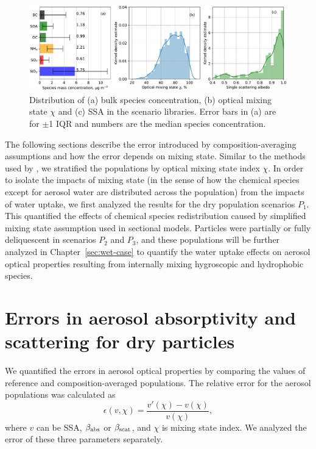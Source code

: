 \documentclass[edeposit,fullpage]{uiucthesis2009}
\begin{document}
\begin{figure}
	\centering
	\includegraphics[scale=0.5]{chap4_figs/fig3.pdf}
	\caption{Distribution of (a) bulk species concentration, (b)
          optical mixing state $\chi$ and (c) SSA in the scenario
          libraries. Error bars in (a) are for $\pm$1 IQR and numbers
          are the median species concentration.}
	\label{fig2:sce_overview}
\end{figure}

The following sections describe the error introduced by
composition-averaging assumptions and how the error depends on mixing
state. Similar to the methods used by \citet{Ching2017}, we stratified
the populations by optical mixing state index $\chi$. In order to
isolate the impacts of mixing state (in the sense of how the chemical
species except for aerosol water are distributed across the
population) from the impacts of water uptake, we first analyzed the
results for the dry population scenarios $P_1$. This quantified the
effects of chemical species redistribution caused by simplified mixing
state assumption used in sectional models. Particles were partially or
fully deliquescent in scenarios $P_2$ and $P_3$, and these populations
will be further analyzed in Chapter~\ref{sec:wet-case} to quantify the
water uptake effects on aerosol optical properties resulting
from internally mixing hygroscopic and hydrophobic species.

\section{Errors in aerosol absorptivity and scattering for dry particles}
\label{sec:dry-case}
We quantified the errors in aerosol optical properties by comparing
the values of reference and composition-averaged
populations. The relative error for the aerosol
populations was calculated as
\begin{equation}
  \epsilon(v,\chi) = \frac{v'(\chi) - v(\chi)}{v(\chi)}, 
\end{equation}
where $v$ can be SSA, $\beta_{\rm abs}$ or $\beta_{\rm scat}$, and
$\chi$ is mixing state index. We analyzed the error of these three
parameters separately.
\end{document}
